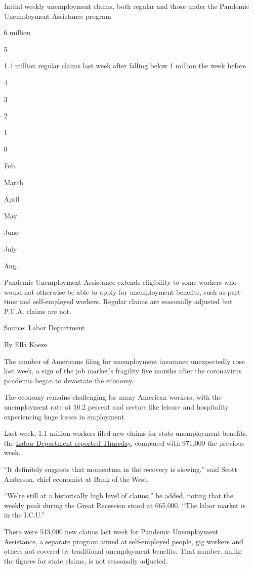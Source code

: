 Initial weekly unemployment claims, both regular and those under the
Pandemic Unemployment Assistance program

6 million

5

1.1 million regular claims last week after falling below 1 million the
week before

4

3

2

1

0

Feb.

March

April

May

June

July

Aug.

Pandemic Unemployment Assistance extends eligibility to some workers who
would not otherwise be able to apply for unemployment benefits, such as
part-time and self-employed workers. Regular claims are seasonally
adjusted but P.U.A. claims are not.

Source: Labor Department

By Ella Koeze

The number of Americans filing for unemployment insurance unexpectedly
rose last week, a sign of the job market's fragility five months after
the coronavirus pandemic began to devastate the economy.

The economy remains challenging for many American workers, with the
unemployment rate at 10.2 percent and sectors like leisure and
hospitality experiencing huge losses in employment.

Last week, 1.1 million workers filed new claims for state unemployment
benefits, the \href{https://www.dol.gov/ui/data.pdf}{Labor Department
reported Thursday}, compared with 971,000 the previous week.

``It definitely suggests that momentum in the recovery is slowing,''
said Scott Anderson, chief economist at Bank of the West.

``We're still at a historically high level of claims,'' he added, noting
that the weekly peak during the Great Recession stood at 665,000. ``The
labor market is in the I.C.U.''

There were 543,000 new claims last week for Pandemic Unemployment
Assistance, a separate program aimed at self-employed people, gig
workers and others not covered by traditional unemployment benefits.
That number, unlike the figures for state claims, is not seasonally
adjusted.


